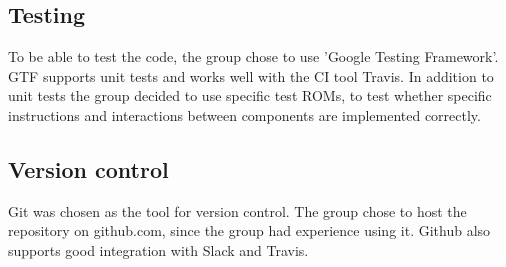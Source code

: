 \subsection{Testing}
    To be able to test the code, the group chose to use 'Google Testing Framework'. GTF supports unit tests and works well with the CI tool Travis. In addition to unit tests the group decided to use specific test ROMs, to test whether specific instructions and interactions between components are implemented correctly.
\subsection{Version control}
    Git was chosen as the tool for version control. The group chose to host the repository on github.com, since the group had experience using it. Github also supports good integration with Slack and Travis.
